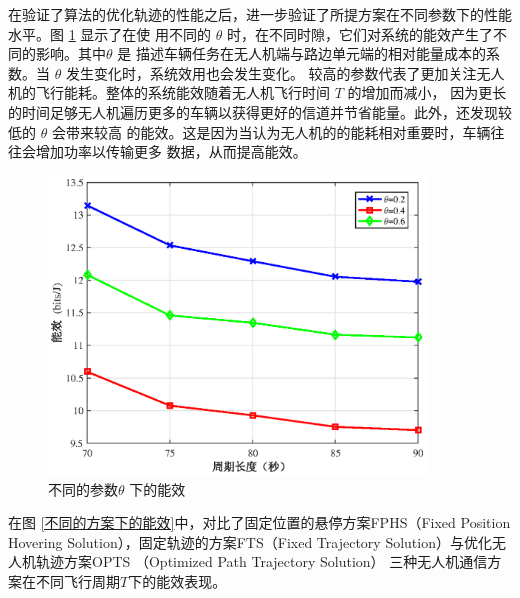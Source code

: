在验证了算法的优化轨迹的性能之后，进一步验证了所提方案在不同参数下的性能水平。图 \ref{不同的参数theta下的能效} 显示了在使
用不同的 $\theta$ 时，在不同时隙，它们对系统的能效产生了不同的影响。其中$\theta$ 是
描述车辆任务在无人机端与路边单元端的相对能量成本的系数。当 $\theta$ 发生变化时，系统效用也会发生变化。
较高的参数代表了更加关注无人机的飞行能耗。整体的系统能效随着无人机飞行时间 $T$ 的增加而减小，
因为更长的时间足够无人机遍历更多的车辆以获得更好的信道并节省能量。此外，还发现较低的 $\theta$ 会带来较高
的能效。这是因为当认为无人机的的能耗相对重要时，车辆往往会增加功率以传输更多
数据，从而提高能效。
\begin{figure}[H]
\centering
\includegraphics[width=10cm]{figures//chap4//不同的参数theta下的能效.eps}
\caption{不同的参数$\theta$ 下的能效}
\label{不同的参数theta下的能效}
\end{figure}

在图 \ref{不同的方案下的能效}中，对比了固定位置的悬停方案FPHS（Fixed Position Hovering Solution），固定轨迹的方案FTS（Fixed Trajectory Solution）与优化无人机轨迹方案OPTS （Optimized Path Trajectory Solution）
三种无人机通信方案在不同飞行周期$T$下的能效表现。

